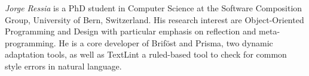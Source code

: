 \documentclass[runningheads]{llncs}
\begin{document}


\noindent \emph{Jorge Ressia} is a PhD student in Computer Science at the Software
Composition Group, University of Bern, Switzerland. His research
interest are Object-Oriented Programming and Design with particular
emphasis on reflection and meta-programming. He is a core developer of
Brif\"{o}st and Prisma, two dynamic adaptation  tools, as well as TextLint
a ruled-based tool to check for common style errors in natural
language.\\
\end{document}
